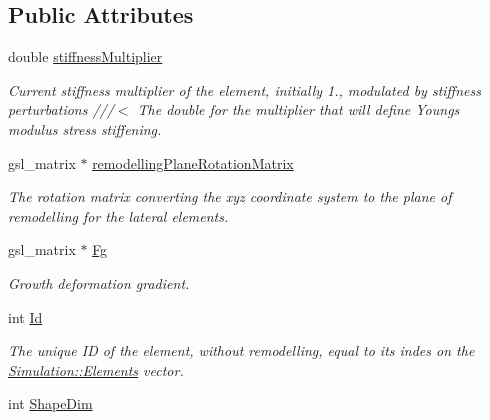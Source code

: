 \subsection*{Public Attributes}
\begin{DoxyCompactItemize}
\item 
\hypertarget{classShapeBase_a9cff4a8549b3399fec12309d18b6db70}{}double \hyperlink{classShapeBase_a9cff4a8549b3399fec12309d18b6db70}{stiffness\+Multiplier}\label{classShapeBase_a9cff4a8549b3399fec12309d18b6db70}

\begin{DoxyCompactList}\small\item\em Current stiffness multiplier of the element, initially 1., modulated by stiffness perturbations ///$<$ The double for the multiplier that will define Young\textquotesingle{}s modulus stress stiffening. \end{DoxyCompactList}\item 
\hypertarget{classShapeBase_a0e8b443e4b55479a9d2a7a7eacd62b69}{}gsl\+\_\+matrix $\ast$ \hyperlink{classShapeBase_a0e8b443e4b55479a9d2a7a7eacd62b69}{remodelling\+Plane\+Rotation\+Matrix}\label{classShapeBase_a0e8b443e4b55479a9d2a7a7eacd62b69}

\begin{DoxyCompactList}\small\item\em The rotation matrix converting the xyz coordinate system to the plane of remodelling for the lateral elements. \end{DoxyCompactList}\item 
\hypertarget{classShapeBase_a4156d7c7f91f0b528214b74277279df0}{}gsl\+\_\+matrix $\ast$ \hyperlink{classShapeBase_a4156d7c7f91f0b528214b74277279df0}{Fg}\label{classShapeBase_a4156d7c7f91f0b528214b74277279df0}

\begin{DoxyCompactList}\small\item\em Growth deformation gradient. \end{DoxyCompactList}\item 
\hypertarget{classShapeBase_ae097764dd4d607b54710d7ca0f7e12f8}{}int \hyperlink{classShapeBase_ae097764dd4d607b54710d7ca0f7e12f8}{Id}\label{classShapeBase_ae097764dd4d607b54710d7ca0f7e12f8}

\begin{DoxyCompactList}\small\item\em The unique I\+D of the element, without remodelling, equal to its indes on the \hyperlink{classSimulation_a96e0aaea7b40dbb5bc11329fc7d34559}{Simulation\+::\+Elements} vector. \end{DoxyCompactList}\item 
\hypertarget{classShapeBase_a4d740b60433d7a9104c2d09b0d52703d}{}int \hyperlink{classShapeBase_a4d740b60433d7a9104c2d09b0d52703d}{Shape\+Dim}\label{classShapeBase_a4d740b60433d7a9104c2d09b0d52703d}


\end{DoxyCompactItemize}
